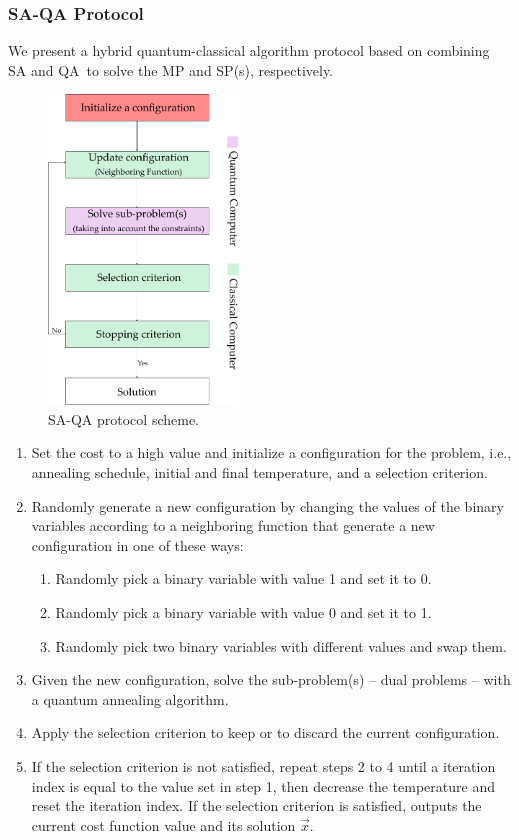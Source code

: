 \subsubsection{SA-QA Protocol}
We present a hybrid quantum-classical algorithm protocol based on combining SA and QA\,\cite{Ding2019ImplementationDesign} to solve the MP and SP(s), respectively.
\begin{figure}[H]
\centering
\includegraphics[width=0.45\textwidth]{Figures/SAQAProtocol_Layer 1.pdf} 
\caption{SA-QA protocol scheme.}
\label{fig:SA_QAProtocol}
\end{figure}
\begin{enumerate}
    \item Set the cost to a high value and initialize a configuration for the problem, i.e., annealing schedule, initial and final temperature, and a selection criterion.
    \item Randomly generate a new configuration by changing the values of the binary variables according to a neighboring function that generate a new configuration in one of these ways:
    \begin{enumerate}
        \item Randomly pick a binary variable with value 1 and set it to 0.
        \item Randomly pick a binary variable with value 0 and set it to 1.
        \item Randomly pick two binary variables with different values and swap them.
    \end{enumerate}
    \item Given the new configuration, solve the sub-problem(s) -- dual problems -- with a quantum annealing algorithm.
    \item Apply the selection criterion to keep or to discard the current configuration.
    \item If the selection criterion is not satisfied, repeat steps 2 to 4 until a iteration index is equal to the value set in step 1, then decrease the temperature and reset the iteration index. If the selection criterion is satisfied, outputs the current cost function value and its solution $\vec{x}$.
\end{enumerate}
